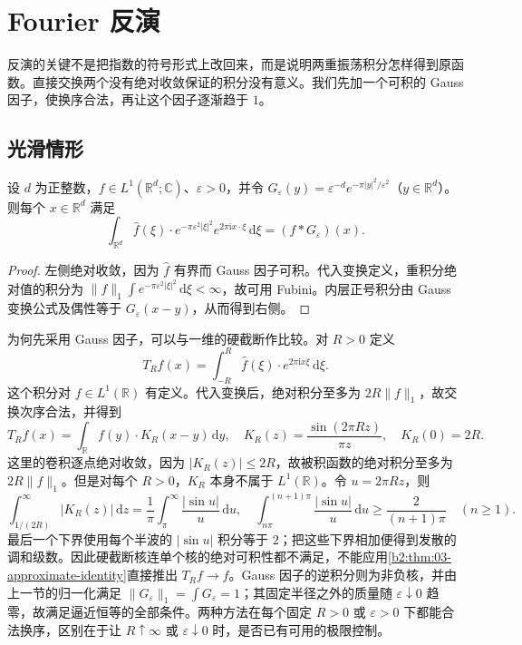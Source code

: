\section{Fourier 反演}
\label{b2:sec:0305}

反演的关键不是把指数的符号形式上改回来，而是说明两重振荡积分怎样得到原函数。直接交换两个没有绝对收敛保证的积分没有意义。我们先加一个可积的 Gauss 因子，使换序合法，再让这个因子逐渐趋于 \(1\)。

\subsection{光滑情形}
\label{b2:subsec:030501}

\begin{lemma}\label{b2:lem:03-gaussian-inversion}
设 \(d\) 为正整数，\(f\in L^1(\mathbb R^d;\mathbb C)\)、\(\varepsilon>0\)，并令 \(G_\varepsilon(y)=\varepsilon^{-d}e^{-\pi|y|^2/\varepsilon^2}\)（\(y\in\mathbb R^d\)）。则每个 \(x\in\mathbb R^d\) 满足
\begin{equation}\label{b2:eq:03-gaussian-inversion}
 \int_{\mathbb R^d}\widehat f(\xi)\cdot e^{-\pi\varepsilon^2|\xi|^2}e^{2\pi\mathrm{i}x\cdot\xi}\,\mathrm{d}\xi
 =(f*G_\varepsilon)(x).
\end{equation}
\end{lemma}
\begin{proof}
左侧绝对收敛，因为 \(\widehat f\) 有界而 Gauss 因子可积。代入变换定义，重积分绝对值的积分为 \(\|f\|_1\int e^{-\pi\varepsilon^2|\xi|^2}\,\mathrm{d}\xi<\infty\)，故可用 Fubini。内层正号积分由 Gauss 变换公式及偶性等于 \(G_\varepsilon(x-y)\)，从而得到右侧。
\end{proof}

为何先采用 Gauss 因子，可以与一维的硬截断作比较。对 \(R>0\) 定义
\[
 T_Rf(x)=\int_{-R}^R\widehat f(\xi)\cdot e^{2\pi\mathrm i x\xi}\,\mathrm d\xi.
\]
这个积分对 \(f\in L^1(\mathbb R)\) 有定义。代入变换后，绝对积分至多为 \(2R\|f\|_1\)，故交换次序合法，并得到
\[
 T_Rf(x)=\int_{\mathbb R}f(y)\cdot K_R(x-y)\,\mathrm dy,
 \quad K_R(z)=\frac{\sin(2\pi Rz)}{\pi z},\quad K_R(0)=2R.
\]
这里的卷积逐点绝对收敛，因为 \(|K_R(z)|\leq2R\)，故被积函数的绝对积分至多为 \(2R\|f\|_1\)。但是对每个 \(R>0\)，\(K_R\) 本身不属于 \(L^1(\mathbb R)\)。令 \(u=2\pi Rz\)，则
\[
 \int_{1/(2R)}^\infty|K_R(z)|\,\mathrm dz
 =\frac1\pi\int_\pi^\infty\frac{|\sin u|}{u}\,\mathrm du,
 \quad
 \int_{n\pi}^{(n+1)\pi}\frac{|\sin u|}{u}\,\mathrm du
 \geq\frac{2}{(n+1)\pi}\quad(n\geq1).
\]
最后一个下界使用每个半波的 \(|\sin u|\) 积分等于 \(2\)；把这些下界相加便得到发散的调和级数。因此硬截断核连单个核的绝对可积性都不满足，不能应用\cref{b2:thm:03-approximate-identity}直接推出 \(T_Rf\to f\)。Gauss 因子的逆积分则为非负核，并由上一节的归一化满足 \(\|G_\varepsilon\|_1=\int G_\varepsilon=1\)；其固定半径之外的质量随 \(\varepsilon\downarrow0\) 趋零，故满足逼近恒等的全部条件。两种方法在每个固定 \(R>0\) 或 \(\varepsilon>0\) 下都能合法换序，区别在于让 \(R\uparrow\infty\) 或 \(\varepsilon\downarrow0\) 时，是否已有可用的极限控制。

